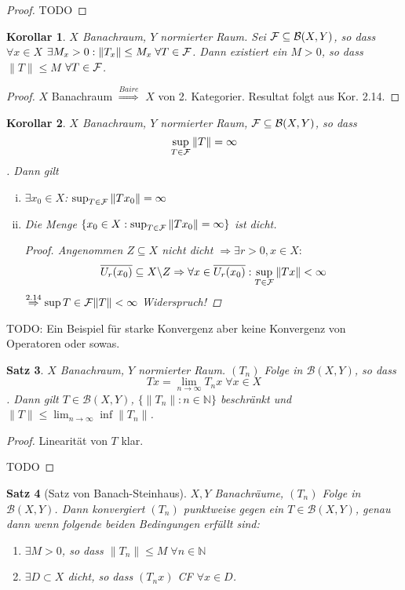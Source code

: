 \documentclass[ngerman]{report}
\theoremstyle{plain}%
\newtheorem{thm}{Satz}[chapter]
\newtheorem{cor}[thm]{Korollar}
\theoremstyle{definition}%
\theoremstyle{myStyle}
\newcommand{\N}{\mathbb{N}}
\newcommand{\BS}[1][X,Y]{\mathcal{B}(#1)} %
\newcommand{\norm}[1]{\|#1\|}
\newcommand{\df}[1][]{%
	\overset{#1}{\Rightarrow}
}
\newcommand{\U}[2][1]{U_{#1}(#2)} %
\newcommand{\limes}[1][\infty]{\lim_{n \to #1}}
\begin{document}
	\begin{proof}
		TODO
	\end{proof}

	\begin{cor}
		$X$ Banachraum, $Y$ normierter Raum. Sei $\F \subseteq \BS$, so dass $\forall x \in X$ $\exists M_x > 0: \norm{T_x} \leq M_x \; \forall T\in \F$. Dann existiert ein $M > 0$, so dass $\norm{T} \leq M$ $\forall T \in \mathcal{F}$.
	\end{cor}

	\begin{proof}
		$X$ Banachraum $\df[Baire]$ $X$ von 2. Kategorier. Resultat folgt aus Kor. 2.14.
	\end{proof}

	\begin{cor}
		$X$ Banachraum, $Y$ normierter Raum, $\F \subseteq \BS$, so dass 
			$$ \sup_{T\in\F} \norm{T} = \infty \vspace{-1em} $$. 
		Dann gilt 
			\begin{enumerate}[(i)]
				\item $\exists x_0 \in X$: $\sup_{T\in \F} \norm{Tx_0} = \infty$
				\item Die Menge $\{x_0 \in X: \sup_{T\in \F} \norm{Tx_0} = \infty\}$ ist dicht.
					\begin{proof}
						Angenommen $Z \subseteq X$ nicht dicht $ \df \exists r>0, x\in X: $
							$$ \overline{\U[r]{x_0}} \subseteq X \backslash Z \df \forall x \in \overline{\U[r]{x_0}} : \sup_{T\in\F} \norm{Tx} < \infty$$
							$\df[2.14] \sup{T\in \F} \norm{T} < \infty$ Widerspruch!
					\end{proof}
			\end{enumerate}

	\end{cor}
TODO: Ein Beispiel für starke Konvergenz aber keine Konvergenz von Operatoren oder sowas.

	\begin{thm}
		$X$ Banachraum, $Y$ normierter Raum. $(T_n)$ Folge in $\BS$, so dass 
			$$ Tx = \limes T_n x \; \forall x\in X$$. 
		Dann gilt $T\in \BS$, $\{\norm{T_n} : n\in \N\}$ beschränkt und $\norm{T} \leq \limes\inf \norm{T_n}$.
	\end{thm}

	\begin{proof}
		Linearität von $T$ klar. \par
TODO
	\end{proof}

	\begin{thm}[Satz von Banach-Steinhaus]
		$X,Y$ Banachräume, $(T_n)$ Folge in $\BS$. Dann konvergiert $(T_n)$ punktweise gegen ein $T\in \BS$, genau dann wenn folgende beiden Bedingungen erfüllt sind:
			\begin{enumerate}[(1)]
				\item $\exists M > 0$, so dass $\norm{T_n} \leq M \; \forall n\in \N$
				\item $\exists D \subset X$ dicht, so dass $(T_n x)$ CF $\forall x\in D$.
			\end{enumerate}
	\end{thm}
\end{document}
